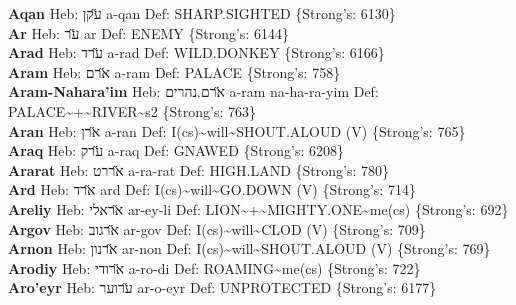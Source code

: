 {\textbf{Aqan} Heb: {\large\H עקן} a-qan Def: SHARP.SIGHTED \{Strong's: 6130\}\hfill{}\\

\textbf{Ar} Heb: {\large\H ער} ar Def: ENEMY \{Strong's: 6144\}\hfill{}\\

\textbf{Arad} Heb: {\large\H ערד} a-rad Def: WILD.DONKEY \{Strong's: 6166\}\hfill{}\\

\textbf{Aram} Heb: {\large\H ארם} a-ram Def: PALACE \{Strong's: 758\}\hfill{}\\

\textbf{Aram-Nahara'im} Heb: {\large\H ארם.נהרים} a-ram na-ha-ra-yim Def: PALACE\textasciitilde{}+\textasciitilde{}RIVER\textasciitilde{}s2 \{Strong's: 763\}\hfill{}\\

\textbf{Aran} Heb: {\large\H ארן} a-ran Def: I(cs)\textasciitilde{}will\textasciitilde{}SHOUT.ALOUD (V) \{Strong's: 765\}\hfill{}\\

\textbf{Araq} Heb: {\large\H ערק} a-raq Def: GNAWED \{Strong's: 6208\}\hfill{}\\

\textbf{Ararat} Heb: {\large\H אררט} a-ra-rat Def: HIGH.LAND \{Strong's: 780\}\hfill{}\\

\textbf{Ard} Heb: {\large\H ארד} ard Def: I(cs)\textasciitilde{}will\textasciitilde{}GO.DOWN (V) \{Strong's: 714\}\hfill{}\\

\textbf{Areliy} Heb: {\large\H אראלי} ar-ey-li Def: LION\textasciitilde{}+\textasciitilde{}MIGHTY.ONE\textasciitilde{}me(cs) \{Strong's: 692\}\hfill{}\\

\textbf{Argov} Heb: {\large\H ארגוב} ar-gov Def: I(cs)\textasciitilde{}will\textasciitilde{}CLOD (V) \{Strong's: 709\}\hfill{}\\

\textbf{Arnon} Heb: {\large\H ארנון} ar-non Def: I(cs)\textasciitilde{}will\textasciitilde{}SHOUT.ALOUD (V) \{Strong's: 769\}\hfill{}\\

\textbf{Arodiy} Heb: {\large\H ארודי} a-ro-di Def: ROAMING\textasciitilde{}me(cs) \{Strong's: 722\}\hfill{}\\

\textbf{Aro'eyr} Heb: {\large\H ערוער} ar-o-eyr Def: UNPROTECTED \{Strong's: 6177\}\hfill{}\\

}
